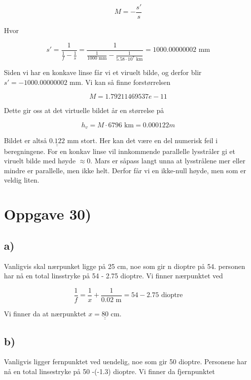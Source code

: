\documentclass[a4paper,norsk, 10pt]{article}
\begin{document}
\begin{equation}
M = -\frac{s'}{s} 
\end{equation}


Hvor 

$$
s' = \frac{1}{\frac{1}{f}-\frac{1}{s}} = \frac{1}{\frac{1}{1000 \text{ mm}}-\frac{1}{5.58 \cdot 10^7 \text{ km}}} = 1000.00000002 \text{ mm}
$$

Siden vi har en konkave linse får vi et viruelt bilde, og derfor blir $s' = -1000.00000002$ mm. Vi kan så finne forstørrelsen

$$
M = 1.79211469537e-11
$$

Dette gir oss at det virtuelle bildet år en størrelse på 

\begin{equation}
h_v = M\cdot 6796 \text{ km}= 0.000122 m
\end{equation}

Bildet er altså $\underline{\underline{0.122}}$ mm stort. Her kan det være en del numerisk feil i beregningene. For en konkav linse vil innkommende parallelle lysstråler gi et viruelt bilde med høyde $\approx 0$. Mars er såpass langt unna at lysstrålene mer eller mindre er parallelle, men ikke helt. Derfor får vi en ikke-null høyde, men som er veldig liten.

\section*{Oppgave 30)}
\subsection*{a)}

Vanligvis skal nærpunket ligge på 25 cm, noe som gir n dioptre på 54. personen har nå en total linsstryke på 54 - 2.75 dioptre. Vi finner nærpunktet ved 

\begin{equation}
\frac{1}{f} = \frac{1}{x} + \frac{1}{0.02 \text{ m}} = 54 - 2.75 \text{ dioptre}
\end{equation}



Vi finner da at nærpunktet $x = \underline{\underline{80}}$ cm.

\subsection*{b)}

Vanligvis ligger fernpunktet ved uendelig, noe som gir 50 dioptre. Personene har nå en total linsestryke på 50 -(-1.3) dioptre. Vi finner da fjernpunktet 
\end{document}
